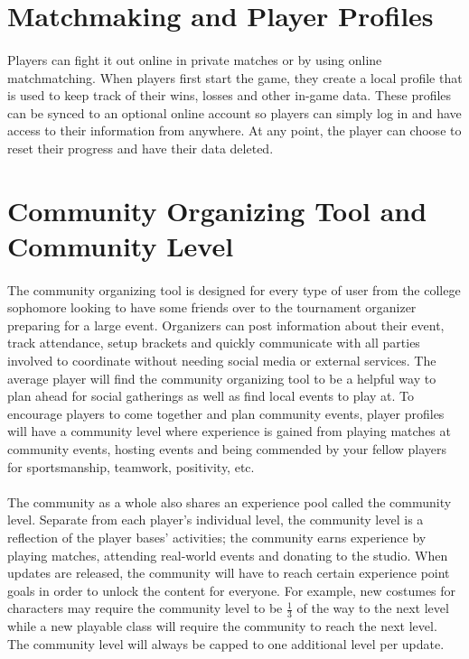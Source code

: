 \noindent\hrulefill

\section{Matchmaking and Player Profiles}

\paragraph{} Players can fight it out online in private matches or by using online matchmatching. When players first start the game, they create a local profile that is used to keep track of their wins, losses and other in-game data. These profiles can be synced to an optional online account so players can simply log in and have access to their information from anywhere. At any point, the player can choose to reset their progress and have their data deleted.

\section{Community Organizing Tool and Community Level}

\paragraph{} The community organizing tool is designed for every type of user from the college sophomore looking to have some friends over to the tournament organizer preparing for a large event. Organizers can post information about their event, track attendance, setup brackets and quickly communicate with all parties involved to coordinate without needing social media or external services. The average player will find the community organizing tool to be a helpful way to plan ahead for social gatherings as well as find local events to play at. To encourage players to come together and plan community events, player profiles will have a community level where experience is gained from playing matches at community events, hosting events and being commended by your fellow players for sportsmanship, teamwork, positivity, etc.

\paragraph{} The community as a whole also shares an experience pool called the community level. Separate from each player's individual level, the community level is a reflection of the player bases' activities; the community earns experience by playing matches, attending real-world events and donating to the studio. When updates are released, the community will have to reach certain experience point goals in order to unlock the content for everyone. For example, new costumes for characters may require the community level to be $\frac{1}{3}$ of the way to the next level while a new playable class will require the community to reach the next level. The community level will always be capped to one additional level per update.

